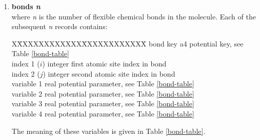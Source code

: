 \begin{enumerate}
\begin{table}[htbp]
\end{table}

\item{\bf bonds {\em n}} \\
where {\em n} is the number of flexible chemical bonds in the
molecule.  Each of the subsequent {\em n} records contains:
\begin{tabbing}
X\=XXXXXXXXXXXX\=XXXXXXXXXXXX\=\kill
\> bond key      \> a4      \> potential key, see Table \ref{bond-table} \\
\> index 1 ($i$) \> integer \> first atomic site index in bond \\
\> index 2 ($j$) \> integer \> second atomic site index in bond \\
\> variable 1    \> real    \> potential parameter, see Table \ref{bond-table} \\
\> variable 2    \> real    \> potential parameter, see Table \ref{bond-table} \\
\> variable 3    \> real    \> potential parameter, see Table \ref{bond-table} \\
\> variable 4    \> real    \> potential parameter, see Table \ref{bond-table}
\end{tabbing}
The meaning of these variables is given in Table \ref{bond-table}.


\end{enumerate}
